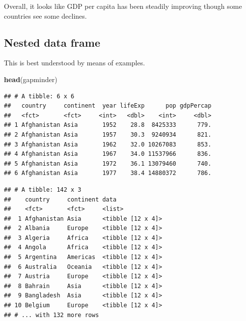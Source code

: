 \documentclass[12pt,]{article}
\newenvironment{Shaded}{\begin{snugshade}}{\end{snugshade}}
\newcommand{\KeywordTok}[1]{\textcolor[rgb]{0.13,0.29,0.53}{\textbf{#1}}}
\newcommand{\StringTok}[1]{\textcolor[rgb]{0.31,0.60,0.02}{#1}}
\newcommand{\CommentTok}[1]{\textcolor[rgb]{0.56,0.35,0.01}{\textit{#1}}}
\newcommand{\OperatorTok}[1]{\textcolor[rgb]{0.81,0.36,0.00}{\textbf{#1}}}
\newcommand{\NormalTok}[1]{#1}
\begin{document}
Overall, it looks like GDP per capita has been steadily improving though
some countries see some declines.

\subsection{Nested data frame}\label{nested-data-frame}

This is best understood by means of examples.

\begin{Shaded}
\begin{Highlighting}[]
\KeywordTok{head}\NormalTok{(gapminder)}
\end{Highlighting}
\end{Shaded}

\begin{verbatim}
## # A tibble: 6 x 6
##   country     continent  year lifeExp      pop gdpPercap
##   <fct>       <fct>     <int>   <dbl>    <int>     <dbl>
## 1 Afghanistan Asia       1952    28.8  8425333      779.
## 2 Afghanistan Asia       1957    30.3  9240934      821.
## 3 Afghanistan Asia       1962    32.0 10267083      853.
## 4 Afghanistan Asia       1967    34.0 11537966      836.
## 5 Afghanistan Asia       1972    36.1 13079460      740.
## 6 Afghanistan Asia       1977    38.4 14880372      786.
\end{verbatim}

\begin{Shaded}
\end{Shaded}

\begin{verbatim}
## # A tibble: 142 x 3
##    country     continent data             
##    <fct>       <fct>     <list>           
##  1 Afghanistan Asia      <tibble [12 x 4]>
##  2 Albania     Europe    <tibble [12 x 4]>
##  3 Algeria     Africa    <tibble [12 x 4]>
##  4 Angola      Africa    <tibble [12 x 4]>
##  5 Argentina   Americas  <tibble [12 x 4]>
##  6 Australia   Oceania   <tibble [12 x 4]>
##  7 Austria     Europe    <tibble [12 x 4]>
##  8 Bahrain     Asia      <tibble [12 x 4]>
##  9 Bangladesh  Asia      <tibble [12 x 4]>
## 10 Belgium     Europe    <tibble [12 x 4]>
## # ... with 132 more rows
\end{verbatim}
\end{document}
